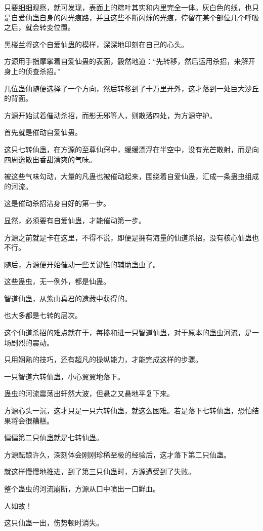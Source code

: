 \begin{this_body}
只要细细观察，就可发现，表面上的粽叶其实和内里完全一体。灰白色的线，也只是自爱仙蛊自身的闪光痕路，并且这些不断闪烁的光痕，停留在某个部位几个呼吸之后，就会转变位置。

黑楼兰将这个自爱仙蛊的模样，深深地印刻在自己的心头。

方源用手指摩挲着自爱仙蛊的表面，毅然地道：“先转移，然后运用杀招，来解开身上的侦查杀招。”

几位蛊仙随便选择了一个方向，然后转移到了十万里开外，这才落到一处巨大沙丘的背面。

方源开始试着催动杀招，而影无邪等人，则散落四处，为方源守护。

首先就是催动自爱仙蛊。

这只七转仙蛊，在方源的至尊仙窍中，缓缓漂浮在半空中，没有光芒散射，而是向四周逸散出香甜清爽的气味。

被这些气味勾动，大量的凡蛊也被催动起来，围绕着自爱仙蛊，汇成一条蛊虫组成的河流。

这是催动杀招洁身自好的第一步。

显然，必须要有自爱仙蛊，才能催动第一步。

方源之前就是卡在这里，不得不说，即便是拥有海量的仙道杀招，没有核心仙蛊也不行。

随后，方源便开始催动一些关键性的辅助蛊虫了。

这些蛊虫，无一例外，都是仙蛊。

智道仙蛊，从紫山真君的遗藏中获得的。

也大多都是七转的层次。

这个仙道杀招的难点就在于，每掺和进一只智道仙蛊，对于原本的蛊虫河流，是一场剧烈的震动。

只用娴熟的技巧，还有超凡的操纵能力，才能完成这样的步骤。

一只智道六转仙蛊，小心翼翼地落下。

蛊虫的河流震荡出轩然大波，但悬之又悬地平复下来。

方源心头一沉，这才只是一只六转仙蛊，就这么困难。若是落下七转仙蛊，恐怕结果将会很糟糕。

偏偏第二只仙蛊就是七转仙蛊。

方源酝酿许久，深刻体会刚刚珍稀至极的经验后，这才落下第二只仙蛊。

就这样慢慢地推进，到了第三只仙蛊时，方源遭受到了失败。

整个蛊虫的河流崩断，方源从口中喷出一口鲜血。

人如故！

这只仙蛊一出，伤势顿时消失。


\end{this_body}
